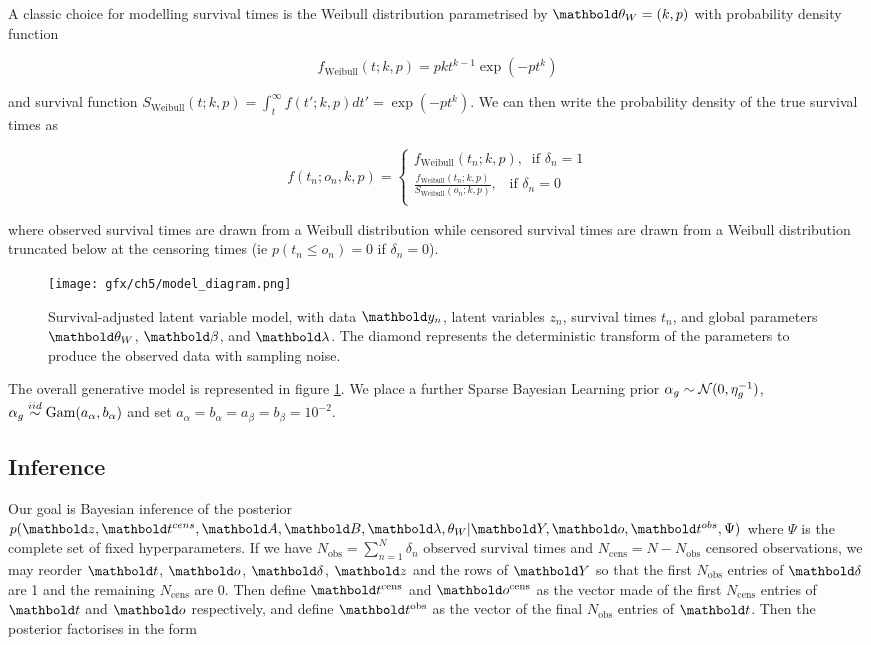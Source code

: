 A classic choice for modelling survival times is the Weibull distribution parametrised by $\mbtheta_W = (k,p)$ with probability density function

\begin{equation}
  f_{\text{Weibull}}(t; k,p) = pkt^{k-1} \exp(-pt^k)
\end{equation}

and survival function $S_{\text{Weibull}}(t; k, p) = \int_t^\infty f(t'; k, p) dt' = \exp(-pt^k)$. We can then write the probability density of the true survival times as

\begin{equation}
  f(t_n; o_n, k, p) =
  \begin{cases}
    f_{\text{Weibull}}(t_n; k, p), \; \; \text{if $\delta_n = 1$} \\
    \frac{f_{\text{Weibull}}(t_n; k, p)}{S_{\text{Weibull}}(o_n; k, p)}, \; \; \; \text{if $\delta_n = 0$} \\
  \end{cases}
\end{equation}

where observed survival times are drawn from a Weibull distribution while censored survival times are drawn from a Weibull distribution truncated below at the censoring times (ie $p(t_n \leq o_n) = 0$ if $\delta_n = 0$).

\begin{figure}
  \centering
\texttt{[image: gfx/ch5/model\_diagram.png]}
\caption{Survival-adjusted latent variable model, with data $\mby_n$, latent variables $z_n$, survival times $t_n$, and global parameters $\mbtheta_W$, $\mbbeta$, and $\mblambda$. The diamond represents the deterministic transform of the parameters to produce the observed data with sampling noise.} \label{fig:model}
\end{figure}

The overall generative model is represented in figure \ref{fig:model}. We place a further Sparse Bayesian Learning prior $\alpha_g \sim \mathcal{N}(0, \eta_g^{-1})$, $\alpha_g \stackrel{iid}{\sim} \textrm{Gam}(a_\alpha, b_\alpha)$ and set $a_\alpha = b_\alpha = a_\beta = b_\beta = 10^{-2}$.



\subsection{Inference}


Our goal is Bayesian inference of the posterior $p(\mbz, \mbt^{cens}, \mbA, \mbB, \mblambda, \theta_W | \mbY, \mbo, \mbt^{obs}, \Psi)$ where $\Psi$ is the complete set of fixed hyperparameters. If we have $N_{\text{obs}} = \sum_{n = 1}^N \delta_n$ observed survival times and $N_{\text{cens}} = N - N_{\text{obs}}$ censored observations, we may reorder $\mbt$, $\mbo$,
$\mbdelta$, $\mbz$ and the rows of $\mbY$ so that the first $N_{\text{obs}}$ entries of $\mbdelta$ are 1 and the remaining $N_{\text{cens}}$ are 0. Then define $\mbt^{\text{cens}}$ and $\mbo^{\text{cens}}$ as the vector made of the first $N_{\text{cens}}$ entries of $\mbt$ and $\mbo$ respectively, and define $\mbt^{\text{obs}}$
as the vector of the final $N_{\text{obs}}$ entries of $\mbt$. Then the posterior factorises in the form

